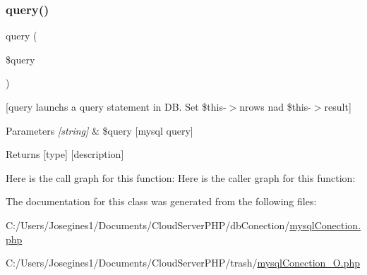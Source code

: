 \subsubsection{\texorpdfstring{query()}{query()}\hspace{0.1cm}{\footnotesize\ttfamily [2/2]}}
{\footnotesize\ttfamily query (\begin{DoxyParamCaption}\item[{}]{\$query }\end{DoxyParamCaption})}

\mbox{[}query launchs a query statement in DB. Set \$this-\/$>$nrows nad \$this-\/$>$result\mbox{]} 
\begin{DoxyParams}{Parameters}
{\em \mbox{[}string\mbox{]}} & \$query \mbox{[}mysql query\mbox{]} \\
\hline
\end{DoxyParams}
\begin{DoxyReturn}{Returns}
\mbox{[}type\mbox{]} \mbox{[}description\mbox{]} 
\end{DoxyReturn}
Here is the call graph for this function\+:
Here is the caller graph for this function\+:


The documentation for this class was generated from the following files\+:\begin{DoxyCompactItemize}
\item 
C\+:/\+Users/\+Josegines1/\+Documents/\+Cloud\+Server\+P\+H\+P/db\+Conection/\mbox{\hyperlink{mysql_conection_8php}{mysql\+Conection.\+php}}\item 
C\+:/\+Users/\+Josegines1/\+Documents/\+Cloud\+Server\+P\+H\+P/trash/\mbox{\hyperlink{mysql_conection___o_8php}{mysql\+Conection\+\_\+\+O.\+php}}\end{DoxyCompactItemize}

